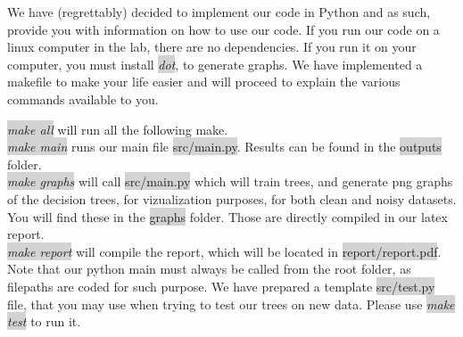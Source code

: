 We have (regrettably) decided to implement our code in Python and as such, provide you with information on how to use our code.
If you run our code on a linux computer in the lab, there are no dependencies. If you run it on your computer, you must install \colorbox{lightgray}{\emph{dot}}, to generate graphs.
We have implemented a makefile to make your life easier and will proceed to explain the various commands available to you.

 \colorbox{lightgray}{\emph{make all}} will run all the following make.\\
 \colorbox{lightgray}{\emph{make main}} runs our main file  \colorbox{lightgray}{src/main.py}. Results can be found
in the  \colorbox{lightgray}{outputs} folder.\\
 \colorbox{lightgray}{\emph{make graphs}} will call  \colorbox{lightgray}{src/main.py} which will train trees, and generate png graphs of the decision trees, for vizualization purposes,
for both clean and noisy datasets. You will find these in the  \colorbox{lightgray}{graphs} folder.
Those are directly compiled in our latex report.\\
 \colorbox{lightgray}{\emph{make report}} will compile the report, which will be located in  \colorbox{lightgray}{report/report.pdf}.\\


Note that our python main must always be called from the root folder, as filepaths are coded for such purpose.
We have prepared a template  \colorbox{lightgray}{src/test.py} file, that you may use when
trying to test our trees on new data.
Please use  \colorbox{lightgray}{\emph{make test}} to run it.





